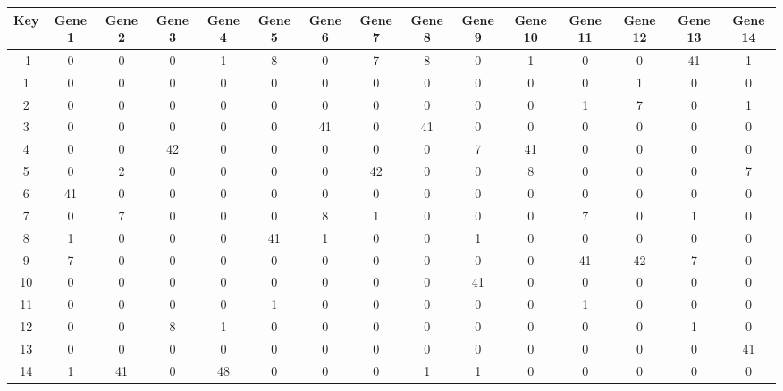 \begin{tabular}{|c|c|c|c|c|c|c|c|c|c|c|c|c|c|c|}
\hline
Key & Gene 1 & Gene 2 & Gene 3 & Gene 4 & Gene 5 & Gene 6 & Gene 7 & Gene 8 & Gene 9 & Gene 10 & Gene 11 & Gene 12 & Gene 13 & Gene 14 \\
\hline
-1 & 0 & 0 & 0 & 1 & 8 & 0 & 7 & 8 & 0 & 1 & 0 & 0 & 41 & 1 \\
1 & 0 & 0 & 0 & 0 & 0 & 0 & 0 & 0 & 0 & 0 & 0 & 1 & 0 & 0 \\
2 & 0 & 0 & 0 & 0 & 0 & 0 & 0 & 0 & 0 & 0 & 1 & 7 & 0 & 1 \\
3 & 0 & 0 & 0 & 0 & 0 & 41 & 0 & 41 & 0 & 0 & 0 & 0 & 0 & 0 \\
4 & 0 & 0 & 42 & 0 & 0 & 0 & 0 & 0 & 7 & 41 & 0 & 0 & 0 & 0 \\
5 & 0 & 2 & 0 & 0 & 0 & 0 & 42 & 0 & 0 & 8 & 0 & 0 & 0 & 7 \\
6 & 41 & 0 & 0 & 0 & 0 & 0 & 0 & 0 & 0 & 0 & 0 & 0 & 0 & 0 \\
7 & 0 & 7 & 0 & 0 & 0 & 8 & 1 & 0 & 0 & 0 & 7 & 0 & 1 & 0 \\
8 & 1 & 0 & 0 & 0 & 41 & 1 & 0 & 0 & 1 & 0 & 0 & 0 & 0 & 0 \\
9 & 7 & 0 & 0 & 0 & 0 & 0 & 0 & 0 & 0 & 0 & 41 & 42 & 7 & 0 \\
10 & 0 & 0 & 0 & 0 & 0 & 0 & 0 & 0 & 41 & 0 & 0 & 0 & 0 & 0 \\
11 & 0 & 0 & 0 & 0 & 1 & 0 & 0 & 0 & 0 & 0 & 1 & 0 & 0 & 0 \\
12 & 0 & 0 & 8 & 1 & 0 & 0 & 0 & 0 & 0 & 0 & 0 & 0 & 1 & 0 \\
13 & 0 & 0 & 0 & 0 & 0 & 0 & 0 & 0 & 0 & 0 & 0 & 0 & 0 & 41 \\
14 & 1 & 41 & 0 & 48 & 0 & 0 & 0 & 1 & 1 & 0 & 0 & 0 & 0 & 0 \\
\hline
\end{tabular}